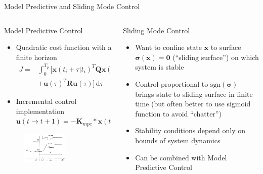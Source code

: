\documentclass[aspectratio=169]{beamer}
\begin{document}
\begin{frame}{Model Predictive and Sliding Mode Control}
    \begin{columns}
        \begin{column}{0.5\textwidth}
            Model Predictive Control
            \begin{itemize}
                \item Quadratic cost function with a finite horizon
                \begin{eqnarray*}
                J = & \int_0^{T_{p}} \! [\mathbf{x}(t_{i}+\tau|t_{i})^T\mathbf{Q}\mathbf{x}(t_{i}+\tau|t_{i}) \\ &  +\Dot{\mathbf{u}}(\tau)^T\mathbf{R}\Dot{\mathbf{u}}(\tau)] \, \mathrm{d}\tau
                \end{eqnarray*}
                \item Incremental control implementation\\
                    $ \mathbf{u}(t\rightarrow{t+1}) = -\mathbf{K}_{mpc}*\mathbf{x}(t)$
            \end{itemize}
            \begin{figure}
                \centering
                \includegraphics[width=0.6\textwidth]{MPC_Premise.PNG}
            \end{figure}
        \end{column}
        \begin{column}{0.5\textwidth}
            Sliding Mode Control
            \begin{itemize}
                \item Want to confine state $\mathbf{x}$ to surface $\boldsymbol{\sigma}(\mathbf{x})=\mathbf{0}$ (``sliding surface'') on which system is stable
                \item Control proportional to $\mathrm{sgn}(\boldsymbol{\sigma})$ brings state to sliding surface in finite time (but often better to use sigmoid function to avoid ``chatter'')
                \item Stability conditions depend only on bounds of system dynamics
                \item Can be combined with Model Predictive Control
            \end{itemize}
        \end{column}
    \end{columns}
\end{frame}
\end{document}
